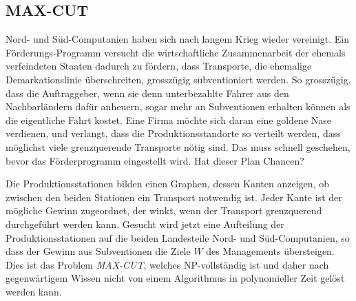 \subsection{MAX-CUT}
Nord- und Süd-Computanien haben sich nach langem Krieg wieder
vereinigt.
Ein Förderungs-Programm versucht die wirtschaftliche
Zusammenarbeit der ehemals verfeindeten Staaten dadurch zu fördern,
dass Transporte, die ehemalige Demarkationslinie überschreiten,
grosszügig subventioniert werden.
So grosszügig, dass die
Auftraggeber, wenn sie denn unterbezahlte Fahrer aus den Nachbarländern
dafür anheuern, sogar mehr an Subventionen erhalten können als
die eigentliche Fahrt kostet.
Eine Firma möchte sich daran eine
goldene Nase verdienen, und verlangt, dass die Produktionsstandorte so verteilt
werden, dass möglichst viele grenzquerende Transporte nötig sind.
Das muss schnell geschehen, bevor das Förderprogramm eingestellt wird.
Hat dieser Plan Chancen?

\medskip

Die Produktionsstationen bilden einen Graphen, dessen Kanten
anzeigen, ob zwischen den beiden Stationen ein Transport notwendig
ist.
Jeder Kante ist der mögliche Gewinn zugeordnet, der winkt,
wenn der Transport grenzquerend durchgeführt werden kann.
Gesucht wird jetzt eine Aufteilung der Produktionsstationen auf die
beiden Landesteile Nord- und Süd-Computanien, so dass der Gewinn
aus Subventionen die Ziele $W$ des Managements übersteigen.
Dies ist das Problem {\it MAX-CUT}, welches NP-vollständig ist
und daher nach gegenwärtigem Wissen nicht von einem Algorithmus
in polynomieller Zeit gelöst werden kann.
